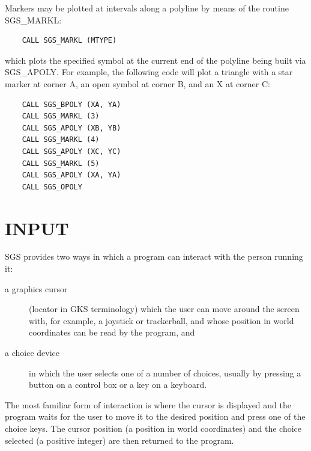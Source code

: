 \documentclass[11pt]{article}
\newcommand{\htmlref}[2]{#1}
\begin{document}
Markers may be plotted at intervals along a polyline by means of the
routine \htmlref{SGS\_MARKL}{SGS_MARKL}:
\begin{verbatim}
    CALL SGS_MARKL (MTYPE)
\end{verbatim}
which plots the specified symbol at the current end of the polyline
being built via \htmlref{SGS\_APOLY}{SGS_APOLY}.
For example, the following code will
plot a triangle with a star marker at corner A,
an open symbol at corner B, and an X at corner C:
\begin{verbatim}
    CALL SGS_BPOLY (XA, YA)
    CALL SGS_MARKL (3)
    CALL SGS_APOLY (XB, YB)
    CALL SGS_MARKL (4)
    CALL SGS_APOLY (XC, YC)
    CALL SGS_MARKL (5)
    CALL SGS_APOLY (XA, YA)
    CALL SGS_OPOLY
\end{verbatim}

\section {INPUT}

SGS provides two ways in which a program can interact with the person running
it:
\begin{description}
\item[a graphics cursor] (locator in GKS terminology) which
the user can move
around the screen with,
for example, a joystick or trackerball, and whose
position in world coordinates can be read by the program, and
\item[a choice device] in which the user
selects one of a number of choices, usually by pressing
a button on a control
box or a key on a keyboard.
\end{description}
The most familiar form of interaction is where the cursor is displayed and the
program waits for the user to move it to the desired position and press one
of the choice keys.  The cursor position (a position in world coordinates) and
the choice selected (a positive integer) are then returned to the program.
\end{document}

